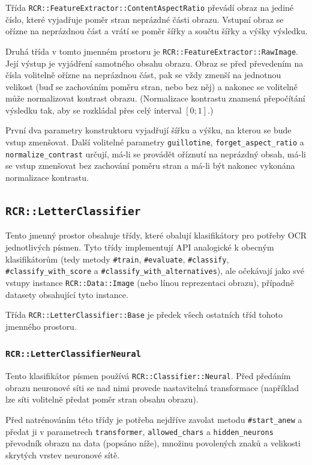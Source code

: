 \documentclass[a4paper]{article}
\begin{document}

Třída \texttt{RCR::FeatureExtractor::ContentAspectRatio} převádí obraz na jediné
číslo, které vyjadřuje poměr stran neprázdné části obrazu. Vstupní obraz se
ořízne na neprázdnou část a vrátí se poměr šířky a součtu šířky a výšky výsledku.

Druhá třída v tomto jmenném prostoru je \texttt{RCR::FeatureExtractor::RawImage}.
Její výstup je vyjádření samotného obsahu obrazu. Obraz se před převedením na
čísla volitelně ořízne na neprázdnou část, pak se vždy zmenší na jednotnou velikost
(buď se zachováním poměru stran, nebo bez něj) a nakonec se volitelně může
normalizovat kontrast obrazu. (Normalizace kontrastu znamená přepočítání
výsledku tak, aby se rozkládal přes celý interval $[0;1]$.)

První dva parametry konstruktoru vyjadřují šířku a výšku, na kterou se bude
vstup zmenšovat. Další volitelné parametry \texttt{guillotine},
\texttt{forget\_aspect\_ratio} a \texttt{normalize\_contrast} určují, má-li
se provádět oříznutí na neprázdný obsah, má-li se vstup zmenšovat bez zachování
poměru stran a má-li být nakonec vykonána normalizace kontrastu.

\subsection{\texttt{RCR::LetterClassifier}}
Tento jmenný prostor obsahuje třídy, které obalují klasifikátory pro potřeby
OCR jednotlivých písmen. Tyto třídy implementují API analogické k obecným
klasifikátorům (tedy metody \texttt{\#train}, \texttt{\#evaluate}, \texttt{\#classify},
\texttt{\#classify\_with\_score} a \texttt{\#classify\_with\_alternatives}),
ale očekávají jako své vstupy instance \texttt{RCR::Data::Image} (nebo línou
reprezentaci obrazu), případně datasety obsahující tyto instance.

Třída \texttt{RCR::LetterClassifier::Base} je předek všech ostatních tříd
tohoto jmenného prostoru.

\subsubsection{\texttt{RCR::LetterClassifierNeural}}
Tento klasifikátor písmen používá \texttt{RCR::Classifier::Neural}.
Před předáním obrazu neuronové síti se nad nimi provede nastavitelná
transformace (například lze síti volitelně předat poměr stran obsahu
obrazu).

Před natrénováním této třídy je potřeba nejdříve zavolat metodu
\texttt{\#start\_anew} a předat ji v parametrech \texttt{transformer},
\texttt{allowed\_chars} a \texttt{hidden\_neurons} převodník obrazu
na data (popsáno níže), množinu povolených znaků a velikosti skrytých
vrstev neuronové sítě.
\end{document}
